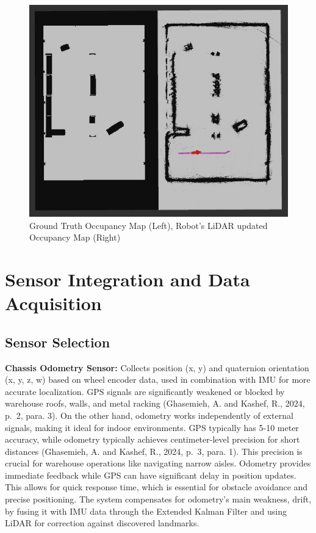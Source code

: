 \documentclass[
  letterpaper,
  DIV=11,
  numbers=noendperiod]{scrartcl}
\begin{document}
\begin{figure}

{\centering \includegraphics{occupancy-map.png}

}

\caption{\label{fig-occupancy-map}Ground Truth Occupancy Map (Left),
Robot's LiDAR updated Occupancy Map (Right)}

\end{figure}

\hypertarget{sensor-integration-and-data-acquisition}{%
\section{Sensor Integration and Data
Acquisition}\label{sensor-integration-and-data-acquisition}}

\hypertarget{sensor-selection}{%
\subsection{Sensor Selection}\label{sensor-selection}}

\textbf{Chassis Odometry Sensor:} Collects position (x, y) and
quaternion orientation (x, y, z, w) based on wheel encoder data, used in
combination with IMU for more accurate localization. GPS signals are
significantly weakened or blocked by warehouse roofs, walls, and metal
racking (Ghasemieh, A. and Kashef, R., 2024, p.~2, para. 3). On the
other hand, odometry works independently of external signals, making it
ideal for indoor environments. GPS typically has 5-10 meter accuracy,
while odometry typically achieves centimeter-level precision for short
distances (Ghasemieh, A. and Kashef, R., 2024, p.~3, para. 1). This
precision is crucial for warehouse operations like navigating narrow
aisles. Odometry provides immediate feedback while GPS can have
significant delay in position updates. This allows for quick response
time, which is essential for obstacle avoidance and precise positioning.
The system compensates for odometry's main weakness, drift, by fusing it
with IMU data through the Extended Kalman Filter and using LiDAR for
correction against discovered landmarks.
\end{document}
